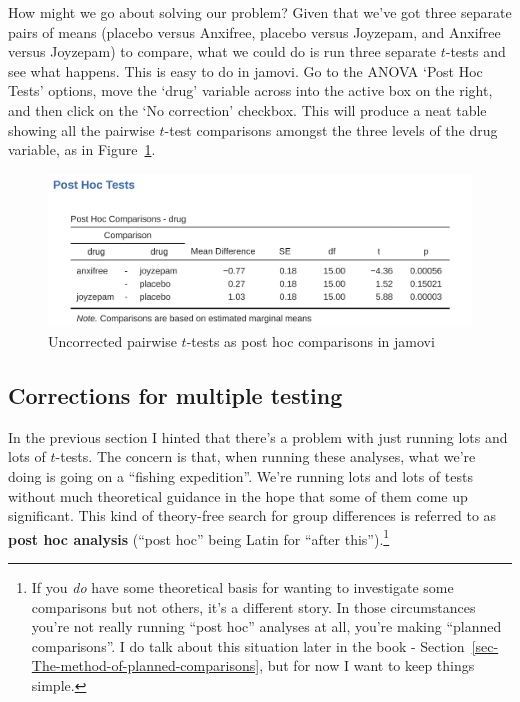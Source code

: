 \documentclass[
  a4paper,
]{book}
\begin{document}
How might we go about solving our problem? Given that we've got three
separate pairs of means (placebo versus Anxifree, placebo versus
Joyzepam, and Anxifree versus Joyzepam) to compare, what we could do is
run three separate \(t\)-tests and see what happens. This is easy to do
in jamovi. Go to the ANOVA `Post Hoc Tests' options, move the `drug'
variable across into the active box on the right, and then click on the
`No correction' checkbox. This will produce a neat table showing all the
pairwise \(t\)-test comparisons amongst the three levels of the drug
variable, as in Figure~\ref{fig-fig13-4}.

\begin{figure}

\includegraphics[width=1\textwidth,height=\textheight]{images/fig13-4.png} \hfill{}

\caption{\label{fig-fig13-4}Uncorrected pairwise \(t\)-tests as post hoc
comparisons in jamovi}

\end{figure}

\hypertarget{corrections-for-multiple-testing}{%
\subsection{Corrections for multiple
testing}\label{corrections-for-multiple-testing}}

In the previous section I hinted that there's a problem with just
running lots and lots of \(t\)-tests. The concern is that, when running
these analyses, what we're doing is going on a ``fishing expedition''.
We're running lots and lots of tests without much theoretical guidance
in the hope that some of them come up significant. This kind of
theory-free search for group differences is referred to as \textbf{post
hoc analysis} (``post hoc'' being Latin for ``after this'').\footnote{If
  you \emph{do} have some theoretical basis for wanting to investigate
  some comparisons but not others, it's a different story. In those
  circumstances you're not really running ``post hoc'' analyses at all,
  you're making ``planned comparisons''. I do talk about this situation
  later in the book -
  Section~\ref{sec-The-method-of-planned-comparisons}, but for now I
  want to keep things simple.}
\end{document}
